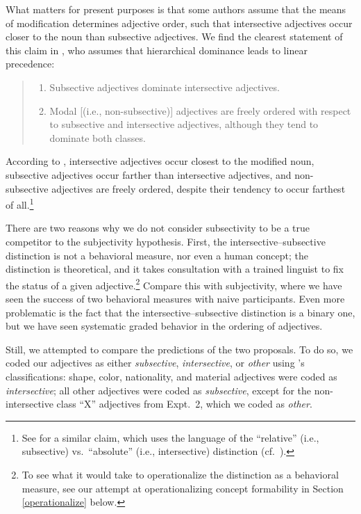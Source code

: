 \documentclass[12pt]{article}
\newcommand{\ben}{\begin{enumerate}}
\newcommand{\een}{\end{enumerate}}
\begin{document}
What matters for present purposes is that some authors assume that the means of modification determines adjective order, such that intersective adjectives occur closer to the noun than subsective adjectives. We find the clearest statement of this claim in \cite{truswell2009}, who assumes that hierarchical dominance leads to linear precedence:

\begin{quotation}
\noindent\ben
	\item Subsective adjectives dominate intersective adjectives. \item Modal [(i.e., non-subsective)] adjectives are freely ordered with respect to subsective and intersective adjectives, although they tend to dominate both classes.
	\een
\end{quotation}

\noindent According to \citeauthor{truswell2009}, intersective adjectives occur closest to the modified noun, subsective adjectives occur farther than intersective adjectives, and non-subsective adjectives are freely ordered, despite their tendency to occur farthest of all.\footnote{See \citet{Sproat1991} for a similar claim, which uses the language of the ``relative'' (i.e., subsective) vs.~``absolute'' (i.e., intersective) distinction (cf.~\citealp{siegel1976}).} 

There are two reasons why we do not consider subsectivity to be a true competitor to the subjectivity hypothesis. First, the intersective--subsective distinction is not a behavioral measure, nor even a human concept; the distinction is theoretical, and it takes consultation with a trained linguist to fix the status of a given adjective.\footnote{To see what it would take to operationalize the distinction as a behavioral measure, see our attempt at operationalizing concept formability in Section \ref{operationalize} below.} Compare this with subjectivity, where we have seen the success of two behavioral measures with naive participants. Even more problematic is the fact that the intersective--subsective distinction is a binary one, but we have seen systematic graded behavior in the ordering of adjectives.

Still, we attempted to compare the predictions of the two proposals. To do so, we coded our adjectives as either \emph{subsective}, \emph{intersective}, or \emph{other} using \citeauthor{truswell2009}'s classifications: shape, color, nationality, and material adjectives were coded as \emph{intersective}; all other adjectives were coded as \emph{subsective}, except for the non-intersective class ``X'' adjectives from Expt.~2, which we coded as \emph{other}.
\end{document}
